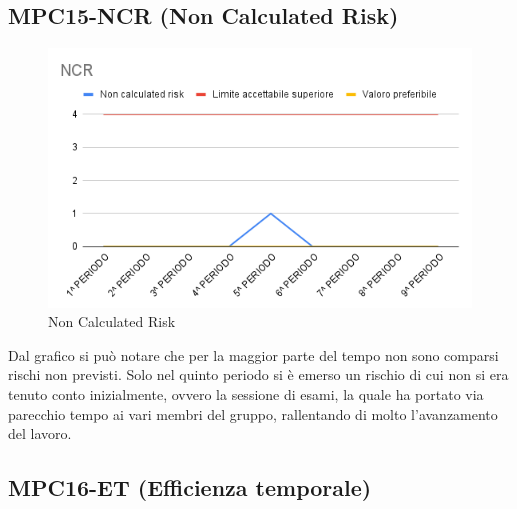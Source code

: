 \subsection{MPC15-NCR (Non Calculated Risk)}
\begin{figure}[H]
  \centering
  \includegraphics[width=0.7\linewidth]{grafici/NCR.png}
  \caption{Non Calculated Risk}
\end{figure}
Dal grafico si può notare che per la maggior parte del tempo non sono comparsi rischi non previsti. Solo nel quinto periodo si è emerso un rischio di cui non si era tenuto conto inizialmente, ovvero la sessione di esami, la quale ha portato via parecchio tempo ai vari membri del gruppo, rallentando di molto l'avanzamento del lavoro.
\subsection{MPC16-ET (Efficienza temporale)}
